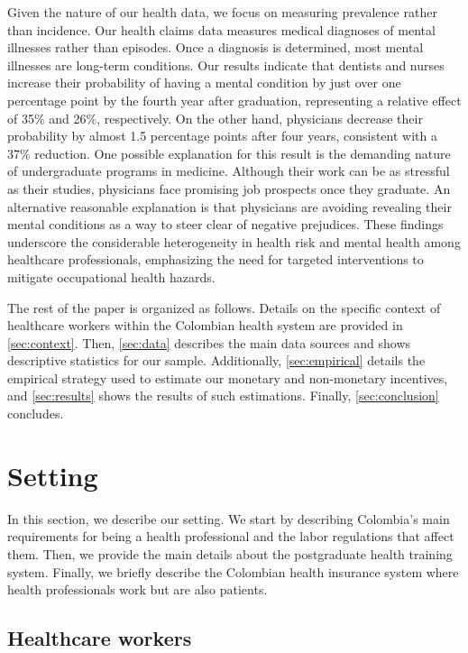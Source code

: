 \documentclass[12pt, a4paper]{article}
\begin{document}
Given the nature of our health data, we focus on measuring prevalence rather than incidence. Our health claims data measures medical diagnoses of mental illnesses rather than episodes. Once a diagnosis is determined, most mental illnesses are long-term conditions. Our results indicate that dentists and nurses increase their probability of having a mental condition by just over one percentage point by the fourth year after graduation, representing a relative effect of 35\% and 26\%, respectively. On the other hand, physicians decrease their probability by almost 1.5 percentage points after four years, consistent with a 37\% reduction. One possible explanation for this result is the demanding nature of undergraduate programs in medicine. Although their work can be as stressful as their studies, physicians face promising job prospects once they graduate. An alternative reasonable explanation is that physicians are avoiding revealing their mental conditions as a way to steer clear of negative prejudices. These findings underscore the considerable heterogeneity in health risk and mental health among healthcare professionals, emphasizing the need for targeted interventions to mitigate occupational health hazards.

The rest of the paper is organized as follows. Details on the specific context of healthcare workers within the Colombian health system are provided in \autoref{sec:context}. Then, \autoref{sec:data} describes the main data sources and shows descriptive statistics for our sample. Additionally, \autoref{sec:empirical} details the empirical strategy used to estimate our monetary and non-monetary incentives, and \autoref{sec:results} shows the results of such estimations. Finally, \autoref{sec:conclusion} concludes.


\section{Setting} \label{sec:context}

In this section, we describe our setting. We start by describing Colombia's main requirements for being a health professional and the labor regulations that affect them. Then, we provide the main details about the postgraduate health training system. Finally, we briefly describe the Colombian health insurance system where health professionals work but are also patients.

\subsection{Healthcare workers}
\end{document}
